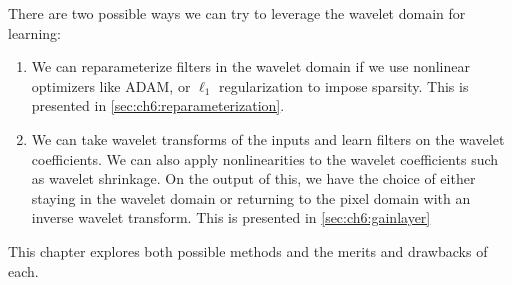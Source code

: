 There are two possible ways we can try to leverage the wavelet domain for
learning: 

\begin{enumerate}
  \item We can reparameterize filters in the wavelet domain if we use nonlinear
  optimizers like ADAM, or $\ell_1$ regularization to impose sparsity. This is
  presented in \autoref{sec:ch6:reparameterization}.
  \item We can take wavelet transforms of the inputs and learn filters on the
    wavelet coefficients. We can also apply nonlinearities to the wavelet coefficients
    such as wavelet shrinkage. On the output of this, we have the choice of either
    staying in the wavelet domain or returning to the pixel domain with an
    inverse wavelet transform. This is presented in \autoref{sec:ch6:gainlayer}
\end{enumerate}

This chapter explores both possible methods and the merits and drawbacks of
each.
